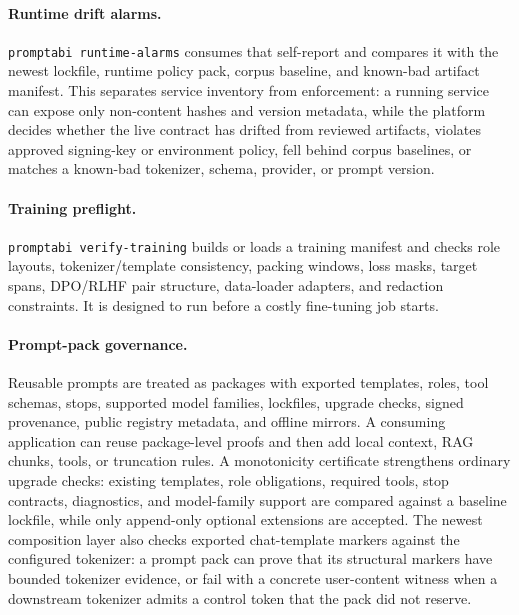 \documentclass[10pt]{article}
\begin{document}
\paragraph{Runtime drift alarms.}
\texttt{promptabi runtime-alarms} consumes that self-report and compares it with
the newest lockfile, runtime policy pack, corpus baseline, and known-bad artifact
manifest. This separates service inventory from enforcement: a running service
can expose only non-content hashes and version metadata, while the platform
decides whether the live contract has drifted from reviewed artifacts, violates
approved signing-key or environment policy, fell behind corpus baselines, or
matches a known-bad tokenizer, schema, provider, or prompt version.

\paragraph{Training preflight.}
\texttt{promptabi verify-training} builds or loads a training manifest and checks
role layouts, tokenizer/template consistency, packing windows, loss masks,
target spans, DPO/RLHF pair structure, data-loader adapters, and redaction
constraints. It is designed to run before a costly fine-tuning job starts.

\paragraph{Prompt-pack governance.}
Reusable prompts are treated as packages with exported templates, roles, tool
schemas, stops, supported model families, lockfiles, upgrade checks, signed
provenance, public registry metadata, and offline mirrors. A consuming
application can reuse package-level proofs and then add local context, RAG
chunks, tools, or truncation rules. A monotonicity certificate strengthens
ordinary upgrade checks: existing templates, role obligations, required tools,
stop contracts, diagnostics, and model-family support are compared against a
baseline lockfile, while only append-only optional extensions are accepted. The
newest composition layer also checks exported chat-template markers against the
configured tokenizer: a prompt pack can prove that its structural markers have
bounded tokenizer evidence, or fail with a concrete user-content witness when a
downstream tokenizer admits a control token that the pack did not reserve.
\end{document}
